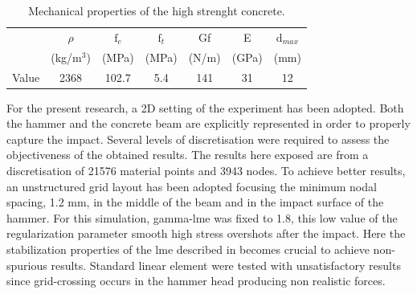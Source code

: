 \documentclass[preprint,12pt,a4paper]{elsarticle}
\begin{document}
\begin{table}
  \centering
  \begin{tabular}[]{c c c c c c c}
    \hline
      &   $\rho$   & $\text{f}_c$ & $\text{f}_t$ & \gls{Gf} &   E   & $\text{d}_{max}$ \\
      & (kg/m$^3$) &     (MPa)    &     (MPa)    & (N/m) & (GPa) & (mm) \\
    \hline
Value &    2368    &     102.7    &      5.4     &  141  &   31  &  12 \\
    \hline
  \end{tabular}
  \caption[Mechanical properties of thje concrete]{Mechanical
    properties of the high strenght concrete.}
  \label{tab:concrete-properties}
\end{table}
For the present research, a 2D setting of the experiment has been
adopted. Both the hammer and the concrete beam are explicitly
represented in order to properly capture the impact. Several levels of
discretisation were required to assess the objectiveness of the
obtained results. The results here exposed are from a discretisation
of 21576 material points and 3943 nodes. To achieve better results, an
unstructured grid layout has been adopted focusing the minimum nodal
spacing, 1.2 mm, in the middle of the beam and in the impact surface
of the hammer. For this simulation, \gls{gamma-lme} was fixed to
1.8, this low value of the regularization parameter smooth high stress
overshots after the impact. Here the stabilization properties of the \acrshort{lme}
described in \cite{Molinos2020} becomes crucial to achieve
non-spurious results. Standard linear element were tested
with unsatisfactory results since grid-crossing occurs in the hammer
head producing non realistic forces.\\
\end{document}
